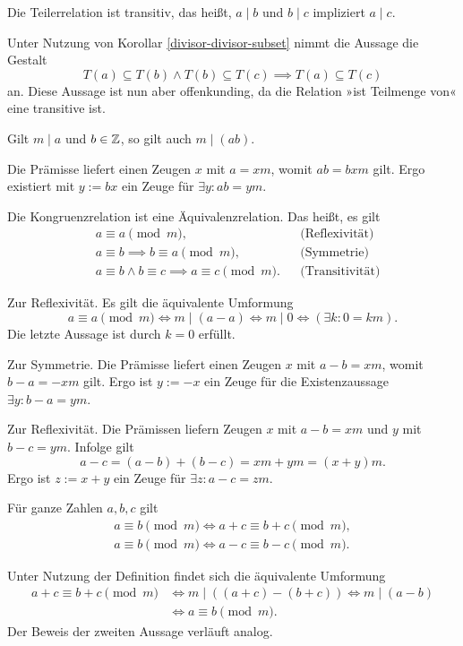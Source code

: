 \begin{Korollar}
Die Teilerrelation ist transitiv, das heißt,
$a\mid b$ und $b\mid c$ impliziert $a\mid c$.
\end{Korollar}
\begin{Beweis}
Unter Nutzung von Korollar \ref{divisor-divisor-subset}
nimmt die Aussage die Gestalt
\[T(a)\subseteq T(b)\land T(b)\subseteq T(c)\implies T(a)\subseteq T(c)\]
an. Diese Aussage ist nun aber offenkunding, da die Relation »ist
Teilmenge von« eine transitive ist.\,\qedsymbol
\end{Beweis}

\begin{Korollar}\label{divides-weaken}
Gilt $m\mid a$ und $b\in\mathbb Z$, so gilt auch $m\mid (ab)$.
\end{Korollar}
\begin{Beweis}
Die Prämisse liefert einen Zeugen $x$ mit $a=xm$, womit $ab=bxm$
gilt. Ergo existiert mit $y:=bx$ ein Zeuge für
$\exists y\colon ab=ym$.\,\qedsymbol
\end{Beweis}

\begin{Korollar}
Die Kongruenzrelation ist eine Äquivalenzrelation. Das heißt, es gilt
\begin{align*}
& a\equiv a\pmod m, && \text{(Reflexivität)}\\
& a\equiv b \implies b\equiv a\pmod m, && \text{(Symmetrie)}\\
& a\equiv b\land b\equiv c\implies a\equiv c\pmod m. && \text{(Transitivität)}
\end{align*}
\end{Korollar}
\begin{Beweis}
Zur Reflexivität. Es gilt die äquivalente Umformung
\[a\equiv a\pmod m \iff m\mid (a-a) \iff m\mid 0\iff (\exists k\colon 0 = km).\]
Die letzte Aussage ist durch $k=0$ erfüllt.

Zur Symmetrie. Die Prämisse liefert einen Zeugen $x$ mit $a-b = xm$,
womit $b-a = -xm$ gilt. Ergo ist $y:=-x$ ein Zeuge für die
Existenzaussage $\exists y\colon b-a = ym$.

Zur Reflexivität. Die Prämissen liefern Zeugen $x$ mit $a-b=xm$
und $y$ mit $b-c=ym$. Infolge gilt
\[a-c = (a-b) + (b-c) = xm + ym = (x+y)m.\]
Ergo ist $z:=x+y$ ein Zeuge für $\exists z\colon a-c = zm$.\,\qedsymbol
\end{Beweis}

\begin{Korollar}\label{cong-shift}
Für ganze Zahlen $a,b,c$ gilt
\begin{gather*}
a\equiv b\pmod m \iff a+c\equiv b+c \pmod m,\\
a\equiv b\pmod m \iff a-c\equiv b-c \pmod m.
\end{gather*}
\end{Korollar}
\begin{Beweis}
Unter Nutzung der Definition findet sich die äquivalente Umformung
\begin{align*}
a+c\equiv b+c\pmod m &\iff m\mid ((a+c)-(b+c))
\iff m\mid (a-b)\\
&\iff a\equiv b\pmod m.
\end{align*}
Der Beweis der zweiten Aussage verläuft analog.\,\qedsymbol
\end{Beweis}

